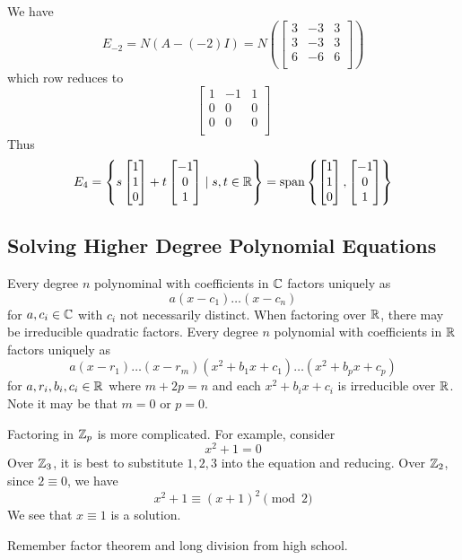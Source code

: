 \documentclass{article}
\DeclareMathOperator{\spn}{span}
\begin{document}
\begin{example}
  We have \[
    E_{-2} = N(A - (-2)I) = N\left(
      \begin{bmatrix}
        3 & -3 & 3\\
        3 & -3 & 3\\
        6 & -6 & 6\\
    \end{bmatrix}\right)
  \] which row reduces to \[
    \begin{bmatrix}
      1 & -1 & 1\\
      0 & 0 & 0\\
      0 & 0 & 0\\
    \end{bmatrix}
  \] Thus \[
    E_{4} = \left\{ s
      \begin{bmatrix}
        1\\1\\0\\
      \end{bmatrix} + t
      \begin{bmatrix}
        -1\\0\\1\\
    \end{bmatrix}\mid s,t \in \R \right\} = \spn \left\{
      \begin{bmatrix}
        1\\1\\0\\
      \end{bmatrix},
      \begin{bmatrix}
        -1\\0\\1\\
    \end{bmatrix}\right\}
  \]
\end{example}
\subsection{Solving Higher Degree Polynomial Equations}
\begin{cthm}
  Every degree $n$ polynominal with coefficients in $\mathbb{C}$ factors uniquely as \[
    a(x-c_1)\dots(x-c_n)
  \]
  for $a, c_i \in \mathbb{C}$ with $c_i$ not necessarily distinct. When factoring over $\mathbb{R}$, there may be irreducible quadratic factors. Every degree $n$ polynomial with coefficients in $\mathbb{R}$ factors uniquely as \[
    a(x-r_1)\dots(x-r_m)(x^2 + b_1x+c_1) \dots(x^2 + b_px + c_p)
  \]
  for $a, r_i, b_i, c_i \in \mathbb{R}$ where $m+2p = n$ and each $x^2 + b_ix + c_i$ is irreducible over $\mathbb{R}$. Note it may be that $m = 0$ or $p = 0$.
\end{cthm}
\begin{theorem}
  Factoring in $\mathbb{Z}_p$ is more complicated. For example, consider \[
    x^2 + 1 = 0
  \]
  Over $\mathbb{Z}_3$, it is best to substitute $1, 2, 3$ into the equation and reducing. Over $\mathbb{Z}_2$, since $2 \equiv 0$, we have \[
    x^2 + 1 \equiv (x+1)^2 \pmod{2}
  \]
  We see that $x \equiv 1$ is a solution.
\end{theorem}
\begin{remark}
  Remember factor theorem and long division from high school.
\end{remark}
\end{document}
